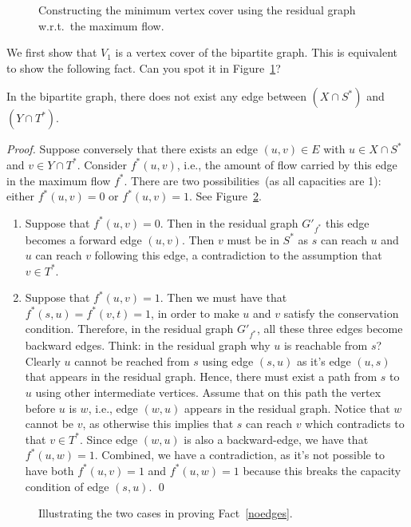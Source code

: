 \begin{figure}[h]
\centering{}
\caption{Constructing the minimum vertex cover using the residual graph w.r.t.\ the maximum flow.}
\label{fig:residual}
\end{figure}

We first show that $V_1$ is a vertex cover of the bipartite graph. This is equivalent to show
the following fact.  Can you spot it in Figure~\ref{fig:residual}?
\begin{fact} \label{noedges}
In the bipartite graph, there does not exist any edge between $(X\cap S^*)$ and $(Y\cap T^*)$. 
\end{fact}
\emph{Proof.} Suppose conversely that there exists an edge $(u,v)\in E$ with $u\in X\cap S^*$ and $v\in Y\cap T^*$.
Consider $f^*(u,v)$, i.e., the amount of flow carried by this edge in the maximum flow $f^*$.
There are two possibilities~(as all capacities are 1): either $f^*(u,v) = 0$ or $f^*(u,v) = 1$. See Figure~\ref{fig:proof}.
\vspace*{-\topsep}
\begin{enumerate}
\item Suppose that $f^*(u,v) = 0$. Then in the residual graph $G'_{f^*}$ this edge becomes a forward edge $(u,v)$.
Then $v$ must be in $S^*$ as $s$ can reach $u$ and $u$ can reach $v$ following this edge, a contradiction
to the assumption that $v\in T^*$.
\item Suppose that $f^*(u,v) = 1$. Then we must have that $f^*(s,u) = f^*(v,t) = 1$, in order to make $u$ and $v$ satisfy
the conservation condition. Therefore, in the residual graph $G'_{f^*}$, all these three edges become backward edges.
Think: in the residual graph why $u$ is reachable from $s$?
Clearly $u$ cannot be reached from $s$ using edge $(s,u)$ as it's edge $(u,s)$ that appears in the residual graph.
Hence, there must exist a path from $s$ to $u$ using other intermediate vertices.
Assume that on this path the vertex before $u$ is $w$, i.e., edge $(w,u)$ appears in the residual graph.
Notice that $w$ cannot be $v$, as otherwise this implies that $s$ can reach $v$ which contradicts to that $v\in T^*$.
Since edge $(w,u)$ is also a backward-edge, we have that $f^*(u,w) = 1$.
Combined, we have a contradiction, as it's not possible to have both $f^*(u,v) = 1$ and $f^*(u,w) = 1$
because this breaks the capacity condition of edge $(s,u)$. \qed
\end{enumerate}

\begin{figure}[t]
\centering{}
\caption{Illustrating the two cases in proving Fact~\ref{noedges}.}
\label{fig:proof}
\end{figure}

